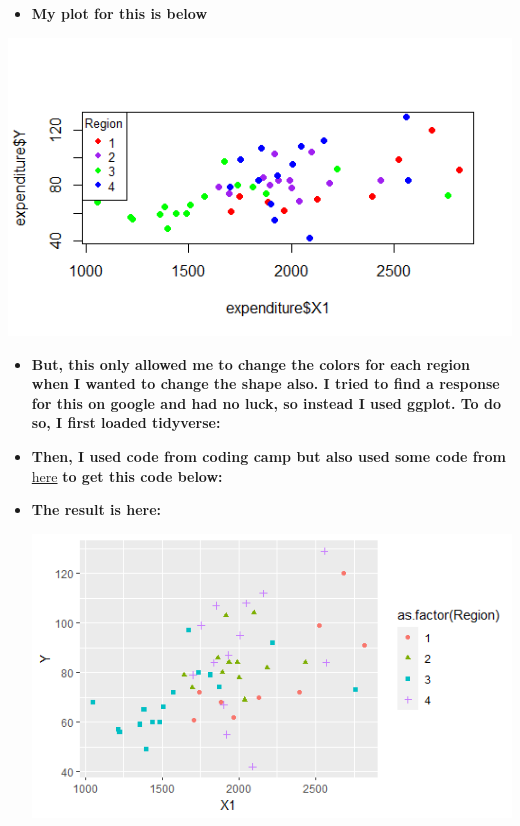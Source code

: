 \documentclass[12pt,letterpaper]{article}
\begin{document}
\begin{itemize}
\begin{itemize}
	\item \textbf{My plot for this is below}
	
\end{itemize}

 \includegraphics[width=.6\textwidth]{base_r_reg_x1_y}\hfill
 
 \begin{itemize}
 	\item \textbf{But, this only allowed me to change the colors for each region when I wanted to change the shape also. I tried to find a response for this on google and had no luck, so instead I used ggplot. To do so, I first loaded tidyverse:}
 	
 		
 		
 	\item \textbf{Then, I used code from coding camp but also used some code from} \href{https://sscc.wisc.edu/sscc/pubs/dvr/three-variables.html}{here} \textbf{to get this code below:}
 	
 		
 		
 	\item \textbf{The result is here:}
 	
 	\includegraphics[width=.8\textwidth]{ggplot_reg_x1_y}\hfill
 	
 \end{itemize}


\end{itemize}
\end{document}
